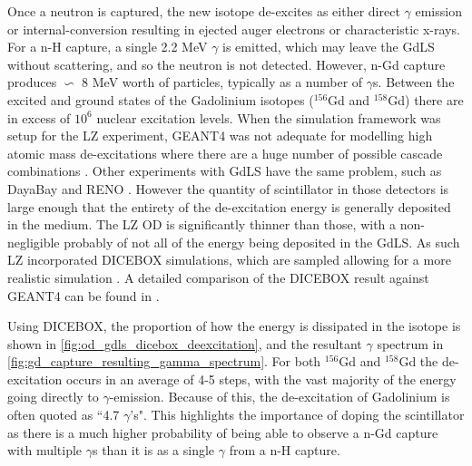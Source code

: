\par
Once a neutron is captured, the new isotope de-excites as either direct $\gamma$ emission or internal-conversion resulting in ejected auger electrons or characteristic x-rays.
For a n-H capture, a single 2.2 MeV $\gamma$ is emitted, which may leave the GdLS without scattering, and so the neutron is not detected.
However, n-Gd capture produces $\backsim$ 8 MeV worth of particles, typically as a number of $\gamma$s.
Between the excited and ground states of the Gadolinium isotopes (${}^{156}$Gd and ${}^{158}$Gd) there are in excess of $10^{6}$ nuclear excitation levels.
When the simulation framework was setup for the LZ experiment, GEANT4 was not adequate for modelling high atomic mass de-excitations where there are a huge number of possible cascade combinations \cite{ucsb_gdls_dicebox_simulations_ref}.
Other experiments with GdLS have the same problem, such as DayaBay \cite{dayabay_overview_ref} and RENO \cite{reno_overview_ref}.
However the quantity of scintillator in those detectors is large enough that the entirety of the de-excitation energy is generally deposited in the medium.
The LZ OD is significantly thinner than those, with a non-negligible probably of not all of the energy being deposited in the GdLS.
As such LZ incorporated DICEBOX \cite{dicebox_simulations_ref} simulations, which are sampled allowing for a more realistic simulation \cite{lz_simulations_ref}.
A detailed comparison of the DICEBOX result against GEANT4 can be found in \cite{ucsb_gdls_dicebox_simulations_ref}.

\par
Using DICEBOX, the proportion of how the energy is dissipated in the isotope is shown in \autoref{fig:od_gdls_dicebox_deexcitation}, and the resultant $\gamma$ spectrum in \autoref{fig:gd_capture_resulting_gamma_spectrum}.
For both ${}^{156}$Gd and ${}^{158}$Gd the de-excitation occurs in an average of 4-5 steps, with the vast majority of the energy going directly to $\gamma$-emission.
Because of this, the de-excitation of Gadolinium is often quoted as ``4.7 $\gamma$'s".
This highlights the importance of doping the scintillator as there is a much higher probability of being able to observe a n-Gd capture with multiple $\gamma$s than it is as a single $\gamma$ from a n-H capture.



